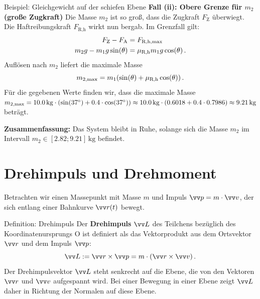 \begin{examplebox}[lower separated=true, breakable]{Beispiel: Gleichgewicht auf der schiefen Ebene}
\textbf{Fall (ii): Obere Grenze für $m_2$ (große Zugkraft)}\newline
Die Masse $m_2$ ist so groß, dass die Zugkraft $F_{\text{Z}}$ überwiegt. Die Haftreibungskraft $F_{\text{R,h}}$ wirkt nun bergab. Im Grenzfall gilt:
\begin{equation}\begin{aligned}
    F_{\text{Z}} - F_{\text{A}} &= F_{\text{R,h,max}} \\
    m_2 g - m_1 g \sin(\theta) &= \mu_{\text{R,h}} m_1 g \cos(\theta)\,.
\end{aligned}\end{equation}
Auflösen nach $m_2$ liefert die maximale Masse
\begin{equation}
    m_{2,\mathrm{max}} = m_1 (\sin(\theta) + \mu_\text{R,h} \cos(\theta)) \,.
\end{equation}
Für die gegebenen Werte finden wir, dass die maximale Masse $m_{2,\mathrm{max}} = \SI{10.0}{kg} \cdot (\sin(\SI{37}{\degree}) + 0.4 \cdot \cos(\SI{37}{\degree})) \approx \SI{10.0}{kg} \cdot (0.6018 + 0.4 \cdot 0.7986) \approx \SI{9.21}{kg}$ beträgt.

\textbf{Zusammenfassung:}\newline
Das System bleibt in Ruhe, solange sich die Masse $m_2$ im Intervall
$m_2 \in [\num{2.82}; \num{9.21}]\,\si{\kilo\gram}$ befindet.
\end{examplebox}




\section{Drehimpuls und Drehmoment}\label{sec: Drehimpuls_Drehmoment}
Betrachten wir einen Massepunkt mit Masse $m$ und Impuls $\ivec{p} = m \cdot \ivec{v}$, der sich entlang einer Bahnkurve $\ivec{r}(t)$ bewegt.
\begin{importantbox}{Definition: Drehimpuls}
Der \textbf{Drehimpuls} $\ivec{L}$ des Teilchens bezüglich des Koordinatenursprungs O ist definiert als das Vektorprodukt aus dem Ortsvektor $\ivec{r}$ und dem Impuls $\ivec{p}$:
\begin{equation}\label{eq: drehimpuls_def}
\ivec{L} := \ivec{r} \times \ivec{p} = m \cdot (\ivec{r} \times \ivec{v})\mDot
\end{equation}
Der Drehimpulsvektor $\ivec{L}$ steht senkrecht auf die Ebene, die von den Vektoren $\ivec{r}$ und $\ivec{v}$ aufgespannt wird. Bei einer Bewegung in einer Ebene zeigt $\ivec{L}$ daher in Richtung der Normalen auf diese Ebene.
\end{importantbox}

